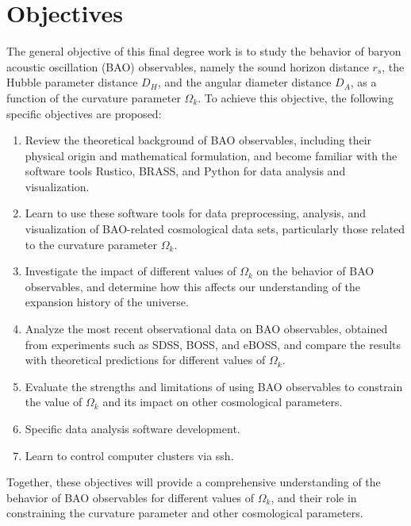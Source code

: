 \chapter{Objectives}
The general objective of this final degree work is to study the behavior of baryon acoustic oscillation (BAO) observables, namely the sound horizon distance $r_s$, the Hubble parameter distance $D_H$, and the angular diameter distance $D_A$, as a function of the curvature parameter $\Omega_k$. To achieve this objective, the following specific objectives are proposed:

\begin{enumerate}
  \item Review the theoretical background of BAO observables, including their physical origin and mathematical formulation, and become familiar with the software tools Rustico, BRASS, and Python for data analysis and visualization.
  \item Learn to use these software tools for data preprocessing, analysis, and visualization of BAO-related cosmological data sets, particularly those related to the curvature parameter $\Omega_k$.
  \item Investigate the impact of different values of $\Omega_k$ on the behavior of BAO observables, and determine how this affects our understanding of the expansion history of the universe.
  \item Analyze the most recent observational data on BAO observables, obtained from experiments such as SDSS, BOSS, and eBOSS, and compare the results with theoretical predictions for different values of $\Omega_k$.
  \item Evaluate the strengths and limitations of using BAO observables to constrain the value of $\Omega_k$ and its impact on other cosmological parameters.
  \item Specific data analysis software development.
  \item Learn to control computer clusters via ssh.
\end{enumerate}
Together, these objectives will provide a comprehensive understanding of the behavior of BAO observables for different values of $\Omega_k$, and their role in constraining the curvature parameter and other cosmological parameters.




